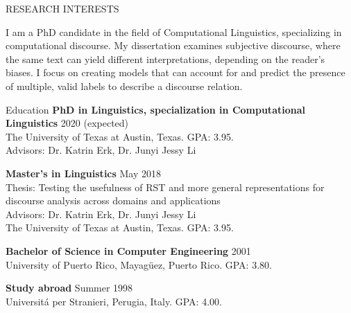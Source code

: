 \documentclass{resume} %
\begin{document}

\begin{rSection}{RESEARCH INTERESTS}
\vspace{-0.3em}
{I am a PhD candidate in the field of Computational Linguistics, specializing in computational discourse. My dissertation examines subjective discourse, where the same text can yield different interpretations, depending on the reader's biases. I focus on creating models that can account for and predict the presence of multiple, valid labels to describe a discourse relation.    

}


\end{rSection}

\begin{rSection}{Education}
\vspace{-0.3em}
{\bf PhD in Linguistics, specialization in Computational Linguistics} \hfill {2020 (expected)}
\\ 
The University of Texas at Austin, Texas. GPA: 3.95. 
\\Advisors: Dr. Katrin Erk, Dr. Junyi Jessy Li

{\bf Master's in Linguistics} \hfill {May 2018}
\\
Thesis: Testing the usefulness of RST and more general representations for discourse analysis across domains and applications
\\Advisors: Dr. Katrin Erk, Dr. Junyi Jessy Li
\\
The University of Texas at Austin, Texas. GPA: 3.95. 

{\bf Bachelor of Science in Computer Engineering} \hfill {2001}
\\ 
University of Puerto Rico, Mayag\"uez, Puerto Rico. GPA: 3.80.

{\textbf{Study abroad}}  \hfill Summer 1998\\
Universit\'a per Stranieri, Perugia, Italy. GPA: 4.00. 

\end{rSection}
\end{document}
